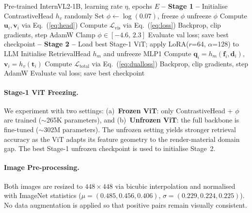 \documentclass[10pt,twocolumn]{article}
\begin{document}
\begin{algorithm}[h]
\caption{Two-Stage ReTR Training}
\label{alg:train}
\begin{algorithmic}[1]
\Require Pre-trained InternVL2-1B, learning rate $\eta$, epochs $E$
\State \textbf{-- Stage 1 --}
\State Initialise ContrastiveHead $h_v$ randomly
\State Set $\phi \leftarrow \log(0.07)$, freeze $\phi$
   unfreeze $\phi$ \EndIf
    \State Compute $\mathbf{u}_i, \mathbf{v}_i$ via Eq.~(\ref{eq:head})
    \State Compute $\mathcal{L}_{\text{vis}}$ via Eq.~(\ref{eq:loss})
    \State Backprop, clip gradients, step AdamW
    \State Clamp $\phi \in [-4.6,\, 2.3]$
  \EndFor
  \State Evaluate val loss; save best checkpoint
\EndFor
\State \textbf{-- Stage 2 --}
\State Load best Stage-1 ViT; apply LoRA($r$=64, $\alpha$=128) to LLM
\State Initialise RetrievalHead $h_m$ and unfreeze MLP1
    \State Compute $\mathbf{q}_i=h_m(\mathbf{f}_i,\mathbf{d}_i)$, $\mathbf{v}_i=h_v(\mathbf{t}_i)$
    \State Compute $\mathcal{L}_{\text{total}}$ via Eq.~(\ref{eq:dualloss})
    \State Backprop, clip gradients, step AdamW
  \EndFor
  \State Evaluate val loss; save best checkpoint
\EndFor
\end{algorithmic}
\end{algorithm}

\paragraph{Stage-1 ViT Freezing.}
We experiment with two settings:
(a)~\textbf{Frozen ViT}: only ContrastiveHead + $\phi$ are trained
($\sim$265K parameters), and
(b)~\textbf{Unfrozen ViT}: the full backbone is fine-tuned
($\sim$302M parameters).
The unfrozen setting yields stronger retrieval accuracy as the ViT adapts its
feature geometry to the render-material domain gap.
The best Stage-1 unfrozen checkpoint is used to initialise Stage~2.

\paragraph{Image Pre-processing.}
Both images are resized to $448\times 448$ via bicubic interpolation and
normalised with ImageNet statistics
($\mu = (0.485, 0.456, 0.406)$,
 $\sigma = (0.229, 0.224, 0.225)$).
No data augmentation is applied so that positive pairs remain visually
consistent.
\end{document}
